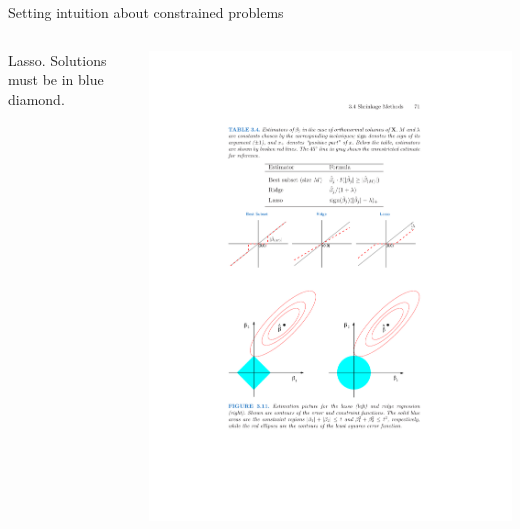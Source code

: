 \documentclass[mathserif, aspectratio=169]{beamer}
\begin{document}
\begin{frame}{Setting intuition about constrained problems}
\begin{columns}
\pause
{}
\begin{center}
Lasso.   Solutions must be in blue diamond.
\end{center}
\includegraphics[scale=0.65]{RSE_lasso_constr}


\end{columns}
\end{frame}
\end{document}
